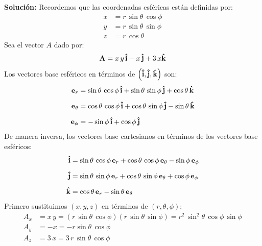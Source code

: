 \documentclass[12pt]{article}
\begin{document}
\begin{enumerate}
\vspace{1cm}
\noindent
\textbf{Solución: } Recordemos que las coordenadas esféricas están definidas por:
\begin{align*}
x &= r \, \sin \theta \, \cos \phi \\[0.5em]
y &= r \, \sin \theta \, \sin \phi \\[0.5em]
z &= r \, \cos \theta
\end{align*}
Sea el vector $A$ dado por:
\begin{align*}
\vb{A} = x \, y \,\vu{i} - x \,\vu{j} + 3 \, x \vu{k}
\end{align*}
Los vectores base esféricos en términos de $\left( \vu{i}, \vu{j}, \vu{k} \right)$ son:
\begin{align*}
\vb{e}_{r} &= \sin \theta \, \cos \phi \,\vu{i} + \sin \theta \, \sin \phi \, \vu{j} + \cos \theta \, \vu{k} \\[0.5em]
\vb{e}_{\theta} &= \cos \theta \, \cos \phi \,\vu{i} + \cos \theta \, \sin \phi \, \vu{j} - \sin \theta \, \vu{k} \\[0.5em]
\vb{e}_{\phi} &= - \sin \phi \, \vu{i} + \cos \phi \, \vu{j}
\end{align*}
De manera inversa, los vectores base cartesianos en términos de los vectores base esféricos:
\begin{align*}
\vu{i} &= \sin \theta \, \cos \phi \, \vb{e}_{r} + \cos \theta \, \cos \phi \, \vb{e}_{\theta} - \sin \phi \, \vb{e}_{\phi} \\[0.5em]
\vu{j} &= \sin \theta \, \sin \phi \,\vb{e}_{r} + \cos \theta \, \sin \phi \, \vb{e}_{\theta} + \cos \phi \, \vb{e}_{\phi} \\[0.5em]
\vu{k} &= \cos \theta \, \vb{e}_{r} - \sin \theta \, \vb{e}_{\theta}
\end{align*}
Primero sustituimos $(x, y, z)$ en términos de $(r, \theta, \phi)$:
\begin{align*}
A_{x} &= x \, y = \left( r \, \sin \theta \, \cos \phi \right) \left( r \, \sin \theta \, \sin \phi \right) = r^{2} \, \sin^2 \theta \, \cos \phi \, \sin \phi \\[0.5em]
A_{y} &= - x = - r \sin \theta \, \cos \phi \\[0.5em]
A_{z} &= 3 \, x = 3 \, r \, \sin \theta \, \cos\phi
\end{align*}


\end{enumerate}
\end{document}
